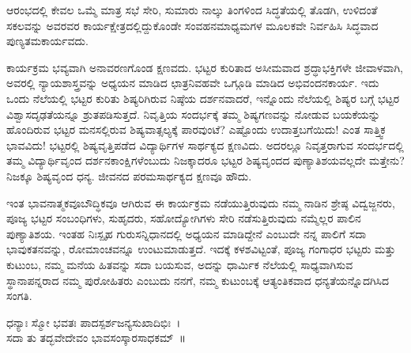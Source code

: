 {ಆರಂಭದಲ್ಲಿ ಕೇವಲ ಒಮ್ಮೆ ಮಾತ್ರ ಸಭೆ ಸೇರಿ, ಸುಮಾರು ನಾಲ್ಕು ತಿಂಗಳಿಂದ ಸಿದ್ಧತೆ\-ಯಲ್ಲಿ ತೊಡಗಿ, ಉಳಿದಂತೆ ಸಕಲವನ್ನು ಅವರವರ ಕಾರ್ಯಕ್ಷೇತ್ರದಲ್ಲಿದ್ದುಕೊಂಡೇ ಸಂವಹನಮಾಧ್ಯಮಗಳ ಮೂಲಕವೇ ನಿರ್ವಹಿಸಿ ಸಿದ್ಧವಾದ ಪುಣ್ಯತಮಕಾರ್ಯವದು. 

ಕಾರ್ಯಕ್ರಮ ಭವ್ಯವಾಗಿ ಅನಾವರಣಗೊಂಡ ಕ್ಷಣವದು. ಭಟ್ಟರ ಕುರಿತಾದ ಅಸೀಮ\-ವಾದ ಶ್ರದ್ಧಾ\enginline{-}ಭಕ್ತಿಗಳೇ ಜೀವಾಳವಾಗಿ, ಅವರಲ್ಲಿ ನ್ಯಾಯಶಾಸ್ತ್ರವನ್ನು ಅಧ್ಯಯನ ಮಾಡಿದ ಛಾತ್ರನಿವಹವೇ ಒಗ್ಗೂಡಿ ಮಾಡಿದ ಅಭಿವಂದನಕಾರ್ಯ.    ಇದು ಒಂದು ನೆಲೆಯಲ್ಲಿ ಭಟ್ಟರ ಕುರಿತು ಶಿಷ್ಯರಿಗಿರುವ ನಿಷ್ಠೆಯ ದರ್ಶನವಾದರೆ, ಇನ್ನೊಂದು ನೆಲೆಯಲ್ಲಿ  ಶಿಷ್ಯರ ಬಗ್ಗೆ ಭಟ್ಟರ ವಿಶ್ವಾಸದೃಢತೆಯನ್ನೂ ಶ್ರುತಪಡಿಸುತ್ತದೆ. ನಿವೃತ್ತಿಯ ಸಂದರ್ಭಕ್ಕೆ  ತಮ್ಮ ಶಿಷ್ಯಗಣವನ್ನು ನೋಡುವ ಬಯಕೆಯನ್ನು ಹೊಂದಿರುವ ಭಟ್ಟರ ಮನಸಲ್ಲಿರುವ ಶಿಷ್ಯವಾತ್ಸಲ್ಯಕ್ಕೆ ಪಾರವುಂಟೆ? ಎಷ್ಟೊಂದು ಉದಾತ್ತಬಗೆಯಿದು! ಎಂತ ಸಾತ್ತ್ವಿಕ ಭಾವವಿದು! ಭಟ್ಟರಲ್ಲಿ ಶಿಷ್ಯವೃತ್ತಿಪಡೆದ ವಿದ್ಯಾರ್ಥಿಗಳ ಸಾರ್ಥಕ್ಯದ ಕ್ಷಣವಿದು. ಅದರಲ್ಲೂ ನಿವೃತ್ತರಾಗುವ ಸಂದರ್ಭದಲ್ಲಿ ತಮ್ಮ ವಿದ್ಯಾರ್ಥಿವೃಂದ  \enginline{-}  ದರ್ಶನಕಾಂಕ್ಷಿಗಳೆಂಬುದು ನಿಜಕ್ಕಾದರೂ ಭಟ್ಟರ ಶಿಷ್ಯವೃಂದದ ಪುಣ್ಯಾತಿಶಯವಲ್ಲದೇ ಮತ್ತೇನು? ನಿಜಕ್ಕೂ ಶಿಷ್ಯವೃಂದ ಧನ್ಯ. ಜೀವನದ ಪರಮಸಾರ್ಥಕ್ಯದ ಕ್ಷಣವೂ ಹೌದು. 

ಇಂತ ಭಾವನಾತ್ಮಕವೂ\enginline{-}ಬೌದ್ಧಿಕವೂ ಆಗಿರುವ ಈ ಕಾರ್ಯಕ್ರಮ ನಡೆಯುತ್ತಿರುವುದು ನಮ್ಮ ನಾಡಿನ ಶ್ರೇಷ್ಠ ವಿದ್ವಜ್ಜನರು, ಪೂಜ್ಯ ಭಟ್ಟರ ಸಂಬಂಧಿಗಳು, ಸುಹೃದರು, ಸಹೋದ್ಯೋಗಿಗಳು ಸೇರಿ ನಡೆಸುತ್ತಿರುವುದು ನಮ್ಮೆಲ್ಲರ ಪಾಲಿನ ಪುಣ್ಯಾತಿಶಯ. ಇಂತಹ ನಿಃಸ್ಪೃಹ ಗುರುಸನ್ನಿಧಾನದಲ್ಲಿ ಅಧ್ಯಯನ ಮಾಡಿದ್ದೇನೆ ಎಂಬುದೇ ನನ್ನ ಪಾಲಿಗೆ ಸದಾ ಭಾವುಕತನವನ್ನು, ರೋಮಾಂಚವನ್ನೂ ಉಂಟುಮಾಡುತ್ತದೆ. ಇದಕ್ಕೆ ಕಳಶ\-ವಿಟ್ಟಂತೆ, ಪೂಜ್ಯ ಗಂಗಾಧರ ಭಟ್ಟರು ಮತ್ತು ಕುಟುಂಬ, ನಮ್ಮ ಮನೆಯ ಹಿತವನ್ನು ಸದಾ ಬಯಸುವ, ಅದನ್ನು ಧಾರ್ಮಿಕ ನೆಲೆಯಲ್ಲಿ ಸಾಧ್ಯವಾಗಿಸುವ ಸ್ಥಾನಾಪನ್ನರಾದ ನಮ್ಮ ಪುರೋಹಿತರು ಎಂಬುದು ನನಗೆ, ನಮ್ಮ ಕುಟುಂಬಕ್ಕೆ ಆತ್ಯಂತಿಕವಾದ ಧನ್ಯತೆಯನ್ನೊದಗಿಸಿದ ಸಂಗತಿ. 
\begin{center}
ಧನ್ಯಾಃ ಸ್ಮೋ ಭವತಃ ಪಾದಸ್ಪರ್ಶಜನ್ಯಸುಖಾದಿಭಿಃ~।\\
ಸದಾ ತು ತದ್ಭವೇದೇವಂ ಭಾವಸಂಸ್ಕಾರಸಾಧಕಮ್~॥
\end{center}

\articleend	
}
